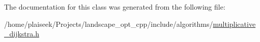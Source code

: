 The documentation for this class was generated from the following file\+:\begin{DoxyCompactItemize}
\item 
/home/plaiseek/\+Projects/landscape\+\_\+opt\+\_\+cpp/include/algorithms/\hyperlink{multiplicative__dijkstra_8h}{multiplicative\+\_\+dijkstra.\+h}\end{DoxyCompactItemize}
